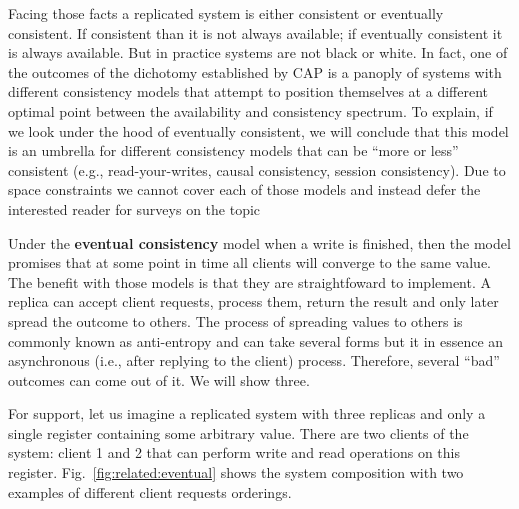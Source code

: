 Facing those facts a replicated system is either consistent or eventually consistent. 
If consistent than it is not always available; if eventually consistent it is always available. 
But in practice systems are not black or white. 
In fact, one of the outcomes of the dichotomy established by CAP is a panoply of systems with different consistency models that attempt to position themselves at a different optimal point between  the availability and consistency spectrum. 
To explain, if we look under the hood of eventually consistent, we will conclude that  this model is an umbrella for different consistency models that can be ``more or less'' consistent (e.g., read-your-writes, causal consistency, session consistency). 
Due to space constraints we cannot cover each of those models and instead defer the interested reader for surveys on the topic \cite{bailis2013eventual, bailis2013eventual}




Under the \textbf{eventual consistency} model when a write is finished, then the model promises that at some point in time all clients will converge to the same value. 
The benefit with those models is that they are straightfoward to implement. 
A replica can accept client requests, process them, return the result and only later spread the outcome to others. 
The process of spreading values to others is commonly known as anti-entropy and can take several forms but it in essence an asynchronous (i.e., after replying to the client) process. 
Therefore, several ``bad'' outcomes can come out of it. 
We will show three. 

For support, let us imagine a replicated system with three replicas and only a single register containing some arbitrary value. There are two clients of the system: client 1 and 2 that can perform write and read operations on this register. Fig.~\ref{fig:related:eventual} shows the system composition with two examples of different client requests orderings. 

